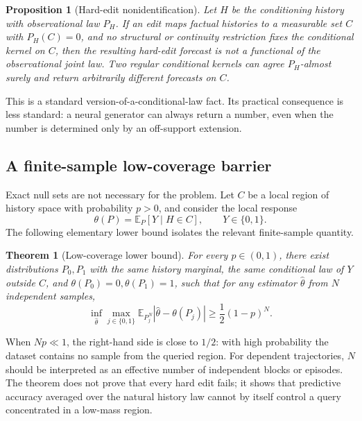 \documentclass{article}
\newcommand{\E}{\mathbb E}
\newtheorem{proposition}[definition]{Proposition}
\newtheorem{theorem}[definition]{Theorem}
\theoremstyle{remark}
\begin{document}
\begin{proposition}[Hard-edit nonidentification]
\label{prop:hard-nonid}
Let \(H\) be the conditioning history with observational law \(P_H\). If an
edit maps factual histories to a measurable set \(C\) with \(P_H(C)=0\), and no
structural or continuity restriction fixes the conditional kernel on \(C\),
then the resulting hard-edit forecast is not a functional of the
observational joint law. Two regular conditional kernels can agree
\(P_H\)-almost surely and return arbitrarily different forecasts on \(C\).
\end{proposition}

This is a standard version-of-a-conditional-law fact. Its practical
consequence is less standard: a neural generator can always return a number,
even when the number is determined only by an off-support extension.

\subsection{A finite-sample low-coverage barrier}

Exact null sets are not necessary for the problem. Let \(C\) be a local region
of history space with probability \(p>0\), and consider the local response
\[
  \theta(P)=\E_P[Y\mid H\in C],
  \qquad Y\in\{0,1\}.
\]
The following elementary lower bound isolates the relevant finite-sample
quantity.

\begin{theorem}[Low-coverage lower bound]
\label{thm:low-coverage}
For every \(p\in(0,1)\), there exist distributions \(P_0,P_1\) with the same
history marginal, the same conditional law of \(Y\) outside \(C\), and
\(\theta(P_0)=0,\theta(P_1)=1\), such that for any estimator
\(\widehat\theta\) from \(N\) independent samples,
\begin{equation}
  \inf_{\widehat\theta}
  \max_{j\in\{0,1\}}
  \E_{P_j^N}\left|\widehat\theta-\theta(P_j)\right|
  \geq \frac12(1-p)^N.
  \label{eq:low-coverage-bound}
\end{equation}
\end{theorem}

When \(Np\ll1\), the right-hand side is close to \(1/2\): with high
probability the dataset contains no sample from the queried region. For
dependent trajectories, \(N\) should be interpreted as an effective number of
independent blocks or episodes. The theorem does not prove that every hard edit
fails; it shows that predictive accuracy averaged over the natural history law
cannot by itself control a query concentrated in a low-mass region.
\end{document}
